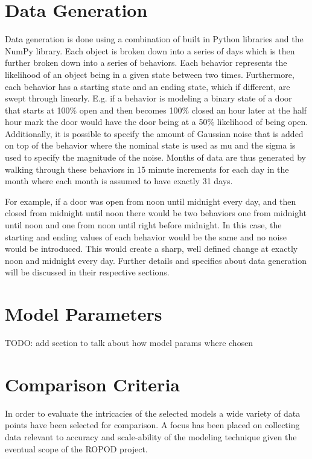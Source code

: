   \section{ Data Generation }

  Data generation is done using a combination of built in Python libraries and
  the NumPy library. Each object is broken down into a series of days which is
  then further broken down into a series of behaviors. Each behavior
  represents the likelihood of an object being in a given state between two
  times.  Furthermore, each behavior has a starting state and an ending state,
  which if different, are swept through linearly. E.g. if a behavior is
  modeling a binary state of a door that starts at 100\% open and then becomes
  100\% closed an hour later at the half hour mark the door would have the
  door being at a 50\% likelihood of being open. Additionally, it is possible
  to specify the amount of Gaussian noise that is added on top of the
  behavior where the nominal state is used as mu and the sigma is used to
  specify the magnitude of the noise. Months of data are thus generated by
  walking through these behaviors in 15 minute increments for each day in the
  month where each month is assumed to have exactly 31 days.

  For example, if a door was open from noon until midnight every day, and then closed from
  midnight until noon there would be two behaviors one from midnight until
  noon and one from noon until right before midnight. In this case, the
  starting and ending values of each behavior would be the same and no noise
  would be introduced. This would create a sharp, well defined change at
  exactly noon and midnight every day. Further details and specifics about data
  generation will be discussed in their respective sections.

  \section{ Model Parameters }
  TODO: add section to talk about how model params where chosen


  \section{ Comparison Criteria }
  In order to evaluate the intricacies of the selected models a wide variety
  of data points have been selected for comparison. A focus has been placed on
  collecting data relevant to accuracy and scale-ability of the modeling
  technique given the eventual scope of the ROPOD project.

